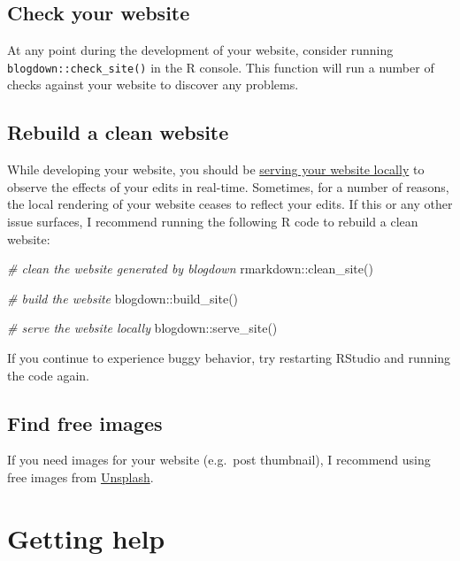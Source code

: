 \documentclass[
]{book}
\newenvironment{Shaded}{\begin{snugshade}}{\end{snugshade}}
\newcommand{\CommentTok}[1]{\textcolor[rgb]{0.56,0.35,0.01}{\textit{#1}}}
\newcommand{\FunctionTok}[1]{\textcolor[rgb]{0.00,0.00,0.00}{#1}}
\newcommand{\NormalTok}[1]{#1}
\newcommand{\SpecialCharTok}[1]{\textcolor[rgb]{0.00,0.00,0.00}{#1}}
\begin{document}
\hypertarget{check-your-website}{%
\section{Check your website}\label{check-your-website}}

At any point during the development of your website, consider running \texttt{blogdown::check\_site()} in the R console. This function will run a number of checks against your website to discover any problems.

\hypertarget{rebuild-a-clean-website}{%
\section{Rebuild a clean website}\label{rebuild-a-clean-website}}

While developing your website, you should be \protect\hyperlink{serve-local}{serving your website locally} to observe the effects of your edits in real-time. Sometimes, for a number of reasons, the local rendering of your website ceases to reflect your edits. If this or any other issue surfaces, I recommend running the following R code to rebuild a clean website:

\begin{Shaded}
\begin{Highlighting}[]
\CommentTok{\# clean the website generated by blogdown}
\NormalTok{rmarkdown}\SpecialCharTok{::}\FunctionTok{clean\_site}\NormalTok{()}

\CommentTok{\# build the website}
\NormalTok{blogdown}\SpecialCharTok{::}\FunctionTok{build\_site}\NormalTok{()}

\CommentTok{\# serve the website locally}
\NormalTok{blogdown}\SpecialCharTok{::}\FunctionTok{serve\_site}\NormalTok{()}
\end{Highlighting}
\end{Shaded}

If you continue to experience buggy behavior, try restarting RStudio and running the code again.

\hypertarget{find-free-images}{%
\section{Find free images}\label{find-free-images}}

If you need images for your website (e.g.~post thumbnail), I recommend using free images from \href{https://unsplash.com/}{Unsplash}.

\hypertarget{get-help}{%
\chapter{Getting help}\label{get-help}}
\end{document}
